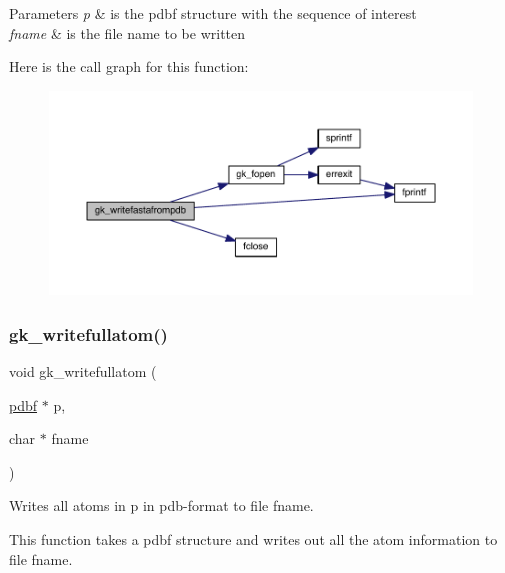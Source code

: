 \begin{DoxyParams}{Parameters}
{\em p} & is the pdbf structure with the sequence of interest \\
\hline
{\em fname} & is the file name to be written \\
\hline
\end{DoxyParams}
Here is the call graph for this function\+:\nopagebreak
\begin{figure}[H]
\begin{center}
\leavevmode
\includegraphics[width=350pt]{a00125_a39b1b4f30c03454894d5218edd8296e0_cgraph}
\end{center}
\end{figure}
\mbox{\label{a00125_a786192984ea62e6824ae9a2d1b902574}} 
\subsubsection{\texorpdfstring{gk\+\_\+writefullatom()}{gk\_writefullatom()}}
{\footnotesize\ttfamily void gk\+\_\+writefullatom (\begin{DoxyParamCaption}\item[{\hyperlink{a00666}{pdbf} $\ast$}]{p,  }\item[{char $\ast$}]{fname }\end{DoxyParamCaption})}



Writes all atoms in p in pdb-\/format to file fname. 

This function takes a pdbf structure and writes out all the atom information to file fname.


